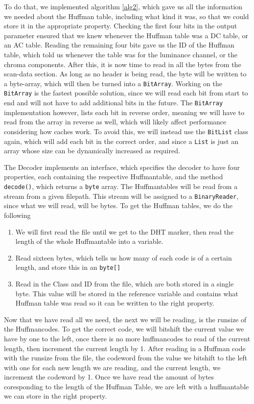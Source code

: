 To do that, we implemented algorithm \ref{alg2}, which gave us all the information we needed about the Huffman table, including what kind it was, so that we could store it in the appropriate property. 
Checking the first four bits in the output parameter ensured that we knew whenever the Huffman table was a DC table, or an AC table. 
Reading the remaining four bits gave us the ID of the Huffman table, which told us whenever the table was for the luminance channel, or the chroma components.
After this, it is now time to read in all the bytes from the scan-data section. As long as no header is being read, the byte will be written to a byte-array, which will then be turned into a \lstinline|BitArray|.
Working on the \lstinline|BitArray| is the fastest possible solution, since we will read each bit from start to end and will not have to add additional bits in the future. The \lstinline|BitArray| implementation however, lists each bit in reverse order, meaning we will have to read from the array in reverse as well, which will likely affect performance considering how caches work.
To avoid this, we will instead use the \lstinline|BitList| class again, which will add each bit in the correct order, and since a \lstinline|List| is just an array whose size can be dynamically increased as required. 

The Decoder implements an interface, which specifies the decoder to have four properties, each containing the respective Huffmantable, and the method \lstinline|decode()|, which returns a \lstinline|byte| array. 
The Huffmantables will be read from a stream from a given filepath. This stream will be assigned to a \lstinline|BinaryReader|, since what we will read, will be bytes. 
To get the Huffman tables, we do the following
\begin{enumerate}
\item We will first read the file until we get to the DHT marker, then read the length of the whole Huffmantable into a variable.
\item Read sixteen bytes, which tells us how many of each code is of a certain length, and store this in an \lstinline|byte[]|
\item Read in the Class and ID from the file, which are both stored in a single byte. This value will be stored in the reference variable and contains what Huffman table was read so it can be written to the right property.
\end{enumerate}
Now that we have read all we need, the next we will be reading, is the runsize of the Huffmancodes. To get the correct code, we will bitshift the current value we have by one to the left, once there is no more huffmancodes to read of the current length, then increment the current length by 1.
After reading in a Huffman code with the runsize from the file, the codeword from the value we bitshift to the left with one for each new length we are reading, and the current length, we increment the codeword by 1.
Once we have read the amount of bytes coresponding to the length of the Huffman Table, we are left with a huffmantable we can store in the right property.
